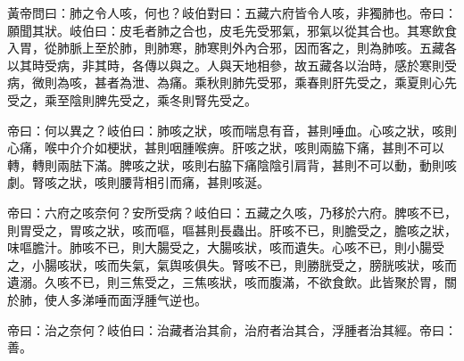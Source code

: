 \documentclass[draft,12pt]{ctexbook}
\begin{document}
\begin{yuanwen}
黃帝問曰：肺之令人咳，何也？岐伯對曰：五藏六府皆令人咳，非獨肺也。帝曰：願聞其狀。岐伯曰：皮毛者肺之合也，皮毛先受邪氣，邪氣以從其合也。其寒飲食入胃，從肺脈上至於肺，則肺寒，肺寒則外內合邪，因而客之，則為肺咳。五藏各以其時受病，非其時，各傳以與之。人與天地相參，故五藏各以治時，感於寒則受病，微則為咳，甚者為泄、為痛。乘秋則肺先受邪，乘春則肝先受之，乘夏則心先受之，乘至陰則脾先受之，乘冬則腎先受之。

帝曰：何以異之？岐伯曰：肺咳之狀，咳而喘息有音，甚則唾血。心咳之狀，咳則心痛，喉中介介如梗狀，甚則咽腫喉痹。肝咳之狀，咳則兩脇下痛，甚則不可以轉，轉則兩胠下滿。脾咳之狀，咳則右脇下痛陰陰引肩背，甚則不可以動，動則咳劇。腎咳之狀，咳則腰背相引而痛，甚則咳涎。

帝曰：六府之咳奈何？安所受病？岐伯曰：五藏之久咳，乃移於六府。脾咳不已，則胃受之，胃咳之狀，咳而嘔，嘔甚則長蟲出。肝咳不已，則膽受之，膽咳之狀，味嘔膽汁。肺咳不已，則大腸受之，大腸咳狀，咳而遺失。心咳不已，則小腸受之，小腸咳狀，咳而失氣，氣舆咳俱失。腎咳不已，則勝胱受之，膀胱咳狀，咳而遺溺。久咳不已，則三焦受之，三焦咳狀，咳而腹滿，不欲食飲。此皆聚於胃，關於肺，使人多涕唾而面浮腫气逆也。

帝曰：治之奈何？岐伯曰：治藏者治其俞，治府者治其合，浮腫者治其經。帝曰：善。
\end{yuanwen}

\end{document}
